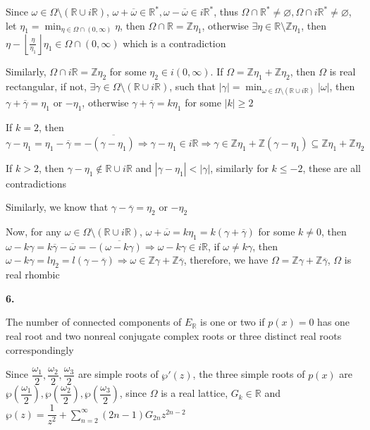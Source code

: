 \documentclass[12pt]{article}
\begin{document}
Since $\omega\in\Omega\setminus(\mathbb{R}\cup i\mathbb{R})$, $\omega+\overline{\omega}\in\mathbb{R}^*,\omega-\overline{\omega}\in i\mathbb{R}^*$, thus $\Omega\cap\mathbb{R}^*\neq\varnothing,\Omega\cap i\mathbb{R}^*\neq\varnothing$, let $\displaystyle\eta_1=\min_{\eta\in\Omega\cap(0,\infty)}\eta$, then $\Omega\cap\mathbb{R}=\mathbb{Z}\eta_1$, otherwise $\exists \eta\in \mathbb{R}\setminus\mathbb{Z}\eta_1$, then $\eta-\left\lfloor\frac{\eta}{\eta_1}\right\rfloor\eta_1\in\Omega\cap(0,\infty)$ which is a contradiction \par
Similarly, $\Omega\cap i\mathbb{R}=\mathbb{Z}\eta_2$ for some $\eta_2\in i(0,\infty)$. If $\Omega=\mathbb{Z}\eta_1+\mathbb{Z}\eta_2$, then $\Omega$ is real rectangular, if not, $\exists \gamma\in\Omega\setminus(\mathbb{R}\cup i\mathbb{R})$, such that $\displaystyle|\gamma|=\min_{\omega\in\Omega\setminus(\mathbb{R}\cup i\mathbb{R})}|\omega|$, then $\gamma+\overline{\gamma}=\eta_1$ or $-\eta_1$, otherwise $\gamma+\overline{\gamma}=k\eta_1$ for some $|k|\geq 2$ \par
If $k=2$, then $\gamma-\eta_1=\eta_1-\overline{\gamma}=-\overline{(\gamma-\eta_1)}\Rightarrow \gamma-\eta_1\in i\mathbb{R}\Rightarrow \gamma\in\mathbb{Z}\eta_1+\mathbb{Z}(\gamma-\eta_1)\subseteq\mathbb{Z}\eta_1+\mathbb{Z}\eta_2$ \par
If $k>2$, then $\gamma-\eta_1\notin \mathbb{R}\cup i\mathbb{R}$ and $|\gamma-\eta_1|<|\gamma|$, similarly for $k\leq -2$, these are all contradictions \par
Similarly, we know that $\gamma-\overline{\gamma}=\eta_2$ or $-\eta_2$ \par
Now, for any $\omega\in\Omega\setminus(\mathbb{R}\cup i\mathbb{R})$, $\omega+\overline{\omega}=k\eta_1=k(\gamma+\overline{\gamma})$ for some $k\neq 0$, then $\omega-k\gamma=k\overline{\gamma}-\overline{\omega}=-\overline{(\omega-k\gamma)}\Rightarrow \omega-k\gamma\in i\mathbb{R}$, if $\omega\neq k\gamma$, then $\omega-k\gamma=l\eta_2=l(\gamma-\overline{\gamma})\Rightarrow \omega\in \mathbb{Z}\gamma+\mathbb{Z}\overline{\gamma}$, therefore, we have $\Omega=\mathbb{Z}\gamma+\mathbb{Z}\overline{\gamma}$, $\Omega$ is real rhombic \par
\textbf{6.} \par
The number of connected components of $E_\mathbb{R}$ is one or two if $p(x)=0$ has one real root and two nonreal conjugate complex roots or three distinct real roots correspondingly \par
Since $\dfrac{\omega_1}{2},\dfrac{\omega_2}{2},\dfrac{\omega_3}{2}$ are simple roots of $\wp'(z)$, the three simple roots of $p(x)$ are $\wp\left(\dfrac{\omega_1}{2}\right),\wp\left(\dfrac{\omega_2}{2}\right),\wp\left(\dfrac{\omega_3}{2}\right)$, since $\Omega$ is a real lattice, $G_k\in\mathbb{R}$ and $\wp(z)=\dfrac{1}{z^2}+\sum_{n=2}^{\infty}(2n-1)G_{2n}z^{2n-2}$ \par
\end{document}
